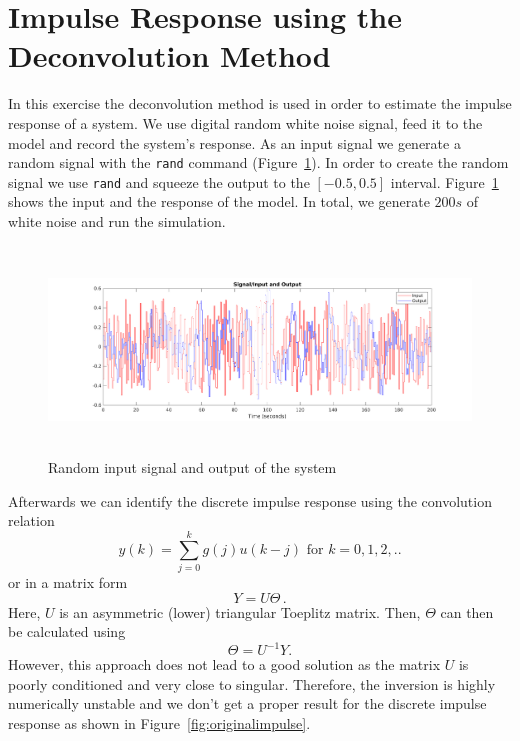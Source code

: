 \documentclass{scrartcl}
\begin{document}
\section{Impulse Response using the Deconvolution Method}\label{section:numdec}
In this exercise the deconvolution method is used in order to estimate the impulse response of a system.
We use digital random white noise signal, feed it to the model and record the system's response.
As an input signal we generate a random signal with the \verb|rand| command (Figure~\ref{fig:inout}).
In order to create the random signal we use \verb|rand| and squeeze the output to the $[-0.5, 0.5]$ interval.
Figure~\ref{fig:inout} shows the input and the response of the model.
In total, we generate $200s$ of white noise and run the simulation.

\begin{figure}[h]
	\centering
	\includegraphics[height=5.5cm]{figures/input_output.pdf}
	\caption{Random input signal and output of the system}
	\label{fig:inout}
\end{figure}
Afterwards we can identify the discrete impulse response using the convolution relation
\begin{equation}
	y(k) = \sum\limits_{j=0}^{k} g(j)u(k-j) \text{ for } k=0,1,2,.. 
\end{equation}
or in a matrix form
\begin{equation}
	Y = U \Theta\, .
\end{equation}
Here, $U$ is an asymmetric (lower) triangular Toeplitz matrix.
Then, $\Theta$ can then be calculated using
\begin{equation}
	\Theta = U^{-1} Y.
\end{equation}
However, this approach does not lead to a good solution as the matrix $U$ is poorly conditioned and very close to singular.
Therefore, the inversion is highly numerically unstable and we don't get a proper result for the discrete impulse response as shown in Figure~\ref{fig:originalimpulse}.
\end{document}
